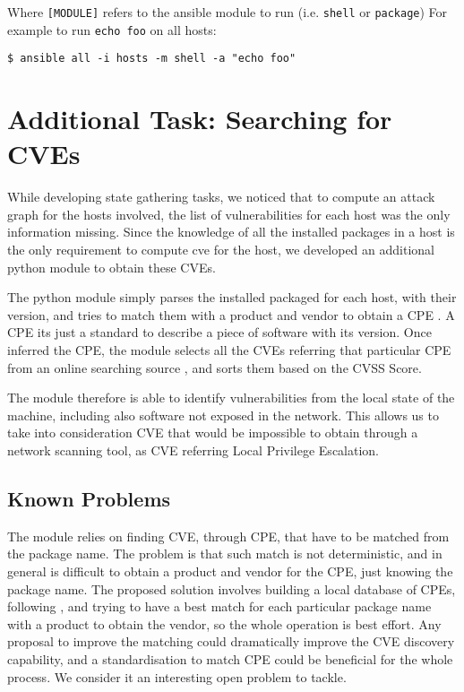\documentclass[11pt]{article}
\begin{document}
Where {\tt [MODULE]} refers to the ansible module to run (i.e. {\tt shell} or {\tt package})
For example to run {\tt echo foo} on all hosts: 

\begin{verbatim}
$ ansible all -i hosts -m shell -a "echo foo"
\end{verbatim}

\section{Additional Task: Searching for CVEs}

While developing state gathering tasks, we noticed that to compute an attack graph for the hosts involved, the list of vulnerabilities for each host was the only information missing. Since the knowledge of all the installed packages in a host is the only requirement to compute cve for the host, we developed an additional python module to obtain these CVEs. 

\bigskip
The python module simply parses the installed packaged for each host, with their version, and tries to match them with a product and vendor to obtain a CPE \cite{cpe}. A CPE its just a standard to describe a piece of software with its version. 
Once inferred the CPE, the module selects all the CVEs referring that particular CPE from an online searching source \cite{cve-search}, and sorts them based on the CVSS Score.

The module therefore is able to identify vulnerabilities from the local state of the machine, including also software not exposed in the network. This allows us to take into consideration CVE that would be impossible to obtain through a network scanning tool, as CVE referring Local Privilege Escalation. 

\subsection{Known Problems}

The module relies on finding CVE, through CPE, that have to be matched from the package name. The problem is that such match is not deterministic, and in general is difficult to obtain a product and vendor for the CPE, just knowing the package name. The proposed solution involves building a local database of CPEs, following \cite{cpedb}, and trying to have a best match for each particular package name with a product to obtain the vendor, so the whole operation is best effort. Any proposal to improve the matching could dramatically improve the CVE discovery capability, and a standardisation to match CPE could be beneficial for the whole process. We consider it an interesting open problem to tackle. 
\end{document}
